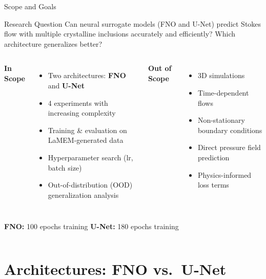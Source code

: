 \documentclass[aspectratio=169, 10pt]{beamer}
\begin{document}
\begin{frame}{Scope and Goals}
  \begin{block}{Research Question}
    Can neural surrogate models (FNO and U-Net) predict Stokes flow
    with multiple crystalline inclusions accurately and efficiently?
    Which architecture generalizes better?
  \end{block}

  \vspace{0.5em}
  \begin{columns}[T]
      \textbf{In Scope}
      \begin{itemize}
        \item Two architectures: \textcolor{fnocolor}{\textbf{FNO}} and \textcolor{unetcolor}{\textbf{U-Net}}
        \item 4 experiments with increasing complexity
        \item Training \& evaluation on LaMEM-generated data
        \item Hyperparameter search (lr, batch size)
        \item Out-of-distribution (OOD) generalization analysis
      \end{itemize}

      \textbf{Out of Scope}
      \begin{itemize}
        \item 3D simulations
        \item Time-dependent flows
        \item Non-stationary boundary conditions
        \item Direct pressure field prediction
        \item Physics-informed loss terms
      \end{itemize}
  \end{columns}

  \vspace{0.5em}
  \begin{columns}[T]
      \textbf{FNO:} 100 epochs training
      \textbf{U-Net:} 180 epochs training
  \end{columns}
\end{frame}

\section{Architectures: FNO vs.\ U-Net}
\end{document}
